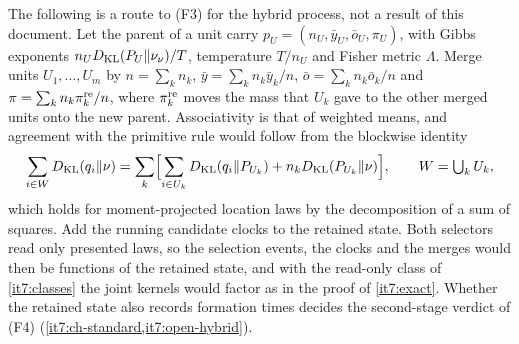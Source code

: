 \documentclass[11pt,letterpaper]{report}
\begin{document}
The following is a route to (F3) for the hybrid process, not a result of this document. Let the parent of a unit carry $p_U=(n_U,\bar y_U,\bar o_U,\pi_U)$, with Gibbs exponents $n_UD_{\mathrm{KL}}(P_U\Vert\nu_\nu)/T$, temperature $T/n_U$ and Fisher metric $\Lambda$. Merge units $U_1,\dots,U_m$ by $n=\sum_kn_k$, $\bar y=\sum_kn_k\bar y_k/n$, $\bar o=\sum_kn_k\bar o_k/n$ and $\pi=\sum_kn_k\pi_k^{\rm re}/n$, where $\pi_k^{\rm re}$ moves the mass that $U_k$ gave to the other merged units onto the new parent. Associativity is that of weighted means, and agreement with the primitive rule would follow from the blockwise identity
\begin{equation}
\sum_{i\in W}D_{\mathrm{KL}}(q_i\Vert\nu)=\sum_{k}\Bigl[\sum_{i\in U_k}D_{\mathrm{KL}}(q_i\Vert P_{U_k})+n_kD_{\mathrm{KL}}(P_{U_k}\Vert\nu)\Bigr],\qquad W=\textstyle\bigcup_kU_k,
\label{it7:blockwise}
\end{equation}
which holds for moment-projected location laws by the decomposition of a sum of squares. Add the running candidate clocks to the retained state. Both selectors read only presented laws, so the selection events, the clocks and the merges would then be functions of the retained state, and with the read-only class of \cref{it7:classes} the joint kernels would factor as in the proof of \cref{it7:exact}. Whether the retained state also records formation times decides the second-stage verdict of (F4) (\cref{it7:ch-standard,it7:open-hybrid}).
\end{document}
